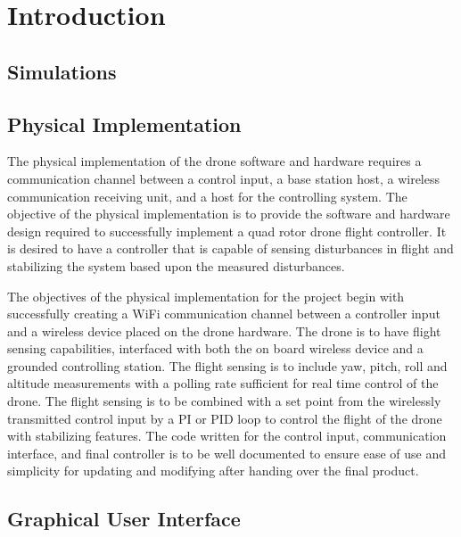 
\section{Introduction}
\subsection{Simulations}

\subsection{Physical Implementation}


The physical implementation of the drone software and hardware requires a communication channel between a control input, a base station host, a wireless communication receiving unit, and a host for the controlling system. The objective of the physical implementation is to provide the software and hardware design required to successfully implement a quad rotor drone flight controller. It is desired to have a controller that is capable of sensing disturbances in flight and stabilizing the system based upon the measured disturbances.

The objectives of the physical implementation for the project begin with successfully creating a WiFi communication channel between a controller input and a wireless device placed on the drone hardware. The drone is to have flight sensing capabilities, interfaced with both the on board wireless device and a grounded controlling station. The flight sensing is to include yaw, pitch, roll and altitude measurements with a polling rate sufficient for real time control of the drone. The flight sensing is to be combined with a set point from the wirelessly transmitted control input by a PI or PID loop to control the flight of the drone with stabilizing features. The code written for the control input, communication interface, and final controller is to be well documented to ensure ease of use and simplicity for updating and modifying after handing over the final product.


\subsection{Graphical User Interface}

